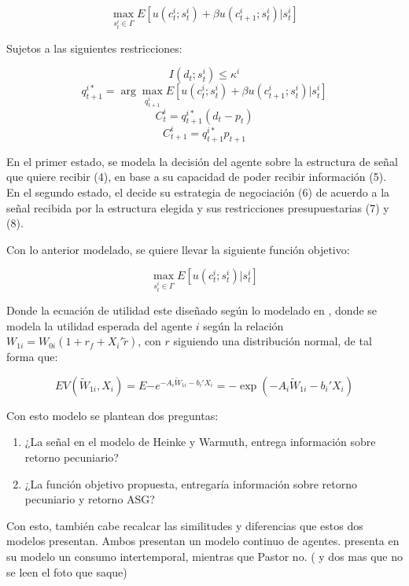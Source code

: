 $$\max_{s_t^i \in \Gamma} E [u(c_t^i; s_t^i) + \beta u(c_{t+1}^i; s_t^i) | s_t^i]$$

Sujetos a las siguientes restricciones:

$$I (d_t; s^i_t) \leq \kappa^i $$
$$ q^{i*}_{t+1} = \arg \max_{q_{t+1}^i} E [u(c_t^i; s_t^i) + \beta u(c_{t+1}^i; s_t^i) | s_t^i]$$
$$C^{i}_t = q^{i*}_{t+1} (d_t - p_t)$$
$$C^{i}_{t+1} = q^{i*}_{t+1} p_{t+1}$$

En el primer estado, se modela la decisión del agente sobre la estructura de señal que quiere recibir (4), en base a su capacidad de poder recibir información (5). En el segundo estado, el decide su estrategia de negociación (6) de acuerdo a la señal recibida por la estructura elegida y sus restricciones presupuestarias (7) y (8).

Con lo anterior modelado, se quiere llevar la siguiente función objetivo:

$$\max_{s_t^i \in \Gamma} E [u(c_t^i; s_t^i) | s_t^i]$$

Donde la ecuación de utilidad este diseñado según lo modelado en \cite{pastor_sustainable_2021}, donde se modela la utilidad esperada del agente $i$ según la relación $W_{1i}=W_{0i}(1 + r_f + X_i' \tilde r)$, con $r$ siguiendo una distribución normal, de tal forma que: 

$$E{V(\tilde W_{1i}, X_i)} = E { -e^{-A_i\tilde W_{1i}-b_i'X_i}} =-\exp\left(-A_i\tilde W_{1i}-b_i'X_i\right) $$

Con esto modelo se plantean dos preguntas:

\begin{enumerate}
    \item ¿La señal en el modelo de Heinke y Warmuth, entrega información sobre retorno pecuniario?
    \item ¿La función objetivo propuesta, entregaría información sobre retorno pecuniario y retorno ASG?
\end{enumerate}

Con esto, también cabe recalcar las similitudes y diferencias que estos dos modelos presentan. Ambos presentan un modelo continuo de agentes. \cite{heinke_rational_2016} presenta en su modelo un consumo intertemporal, mientras que Pastor no. ( y dos mas que no se leen el foto que saque)

\newpage



